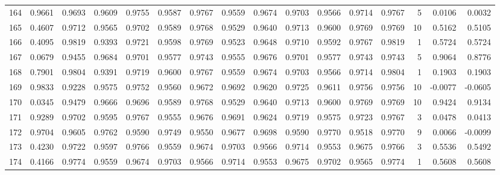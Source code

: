 \begin{tabular}{lrrrrrrrrrrrrrrr}
164 &      0.9661 &  0.9693 &  0.9609 &  0.9755 &  0.9587 &  0.9767 &  0.9559 &  0.9674 &  0.9703 &  0.9566 &   0.9714 &     0.9767 &      5 &                    0.0106 &                     0.0032 \\
165 &      0.4607 &  0.9712 &  0.9565 &  0.9702 &  0.9589 &  0.9768 &  0.9529 &  0.9640 &  0.9713 &  0.9600 &   0.9769 &     0.9769 &     10 &                    0.5162 &                     0.5105 \\
166 &      0.4095 &  0.9819 &  0.9393 &  0.9721 &  0.9598 &  0.9769 &  0.9523 &  0.9648 &  0.9710 &  0.9592 &   0.9767 &     0.9819 &      1 &                    0.5724 &                     0.5724 \\
167 &      0.0679 &  0.9455 &  0.9684 &  0.9701 &  0.9577 &  0.9743 &  0.9555 &  0.9676 &  0.9701 &  0.9577 &   0.9743 &     0.9743 &      5 &                    0.9064 &                     0.8776 \\
168 &      0.7901 &  0.9804 &  0.9391 &  0.9719 &  0.9600 &  0.9767 &  0.9559 &  0.9674 &  0.9703 &  0.9566 &   0.9714 &     0.9804 &      1 &                    0.1903 &                     0.1903 \\
169 &      0.9833 &  0.9228 &  0.9575 &  0.9752 &  0.9560 &  0.9672 &  0.9692 &  0.9620 &  0.9725 &  0.9611 &   0.9756 &     0.9756 &     10 &                   -0.0077 &                    -0.0605 \\
170 &      0.0345 &  0.9479 &  0.9666 &  0.9696 &  0.9589 &  0.9768 &  0.9529 &  0.9640 &  0.9713 &  0.9600 &   0.9769 &     0.9769 &     10 &                    0.9424 &                     0.9134 \\
171 &      0.9289 &  0.9702 &  0.9595 &  0.9767 &  0.9555 &  0.9676 &  0.9691 &  0.9624 &  0.9719 &  0.9575 &   0.9723 &     0.9767 &      3 &                    0.0478 &                     0.0413 \\
172 &      0.9704 &  0.9605 &  0.9762 &  0.9590 &  0.9749 &  0.9550 &  0.9677 &  0.9698 &  0.9590 &  0.9770 &   0.9518 &     0.9770 &      9 &                    0.0066 &                    -0.0099 \\
173 &      0.4230 &  0.9722 &  0.9597 &  0.9766 &  0.9559 &  0.9674 &  0.9703 &  0.9566 &  0.9714 &  0.9553 &   0.9675 &     0.9766 &      3 &                    0.5536 &                     0.5492 \\
174 &      0.4166 &  0.9774 &  0.9559 &  0.9674 &  0.9703 &  0.9566 &  0.9714 &  0.9553 &  0.9675 &  0.9702 &   0.9565 &     0.9774 &      1 &                    0.5608 &                     0.5608 \\

\end{tabular}
